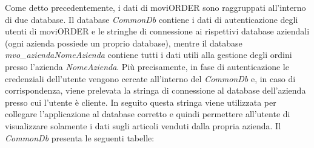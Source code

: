 Come detto precedentemente, i dati di moviORDER sono raggruppati all'interno di due database. Il database \textit{CommonDb} contiene i dati di autenticazione degli utenti di moviORDER e le stringhe di connessione ai rispettivi database aziendali (ogni azienda possiede un proprio database), mentre il database \textit{mvo\_aziendaNomeAzienda} contiene tutti i dati utili alla gestione degli ordini presso l'azienda \textit{NomeAzienda}. Più precisamente, in fase di autenticazione le credenziali dell'utente vengono cercate all'interno del \textit{CommonDb} e, in caso di corrispondenza, viene prelevata la stringa di connessione al database dell'azienda presso cui l'utente è cliente. In seguito questa stringa viene utilizzata per collegare l'applicazione al database corretto e quindi permettere all'utente di visualizzare solamente i dati sugli articoli venduti dalla propria azienda.
Il \textit{CommonDb} presenta le seguenti tabelle:
